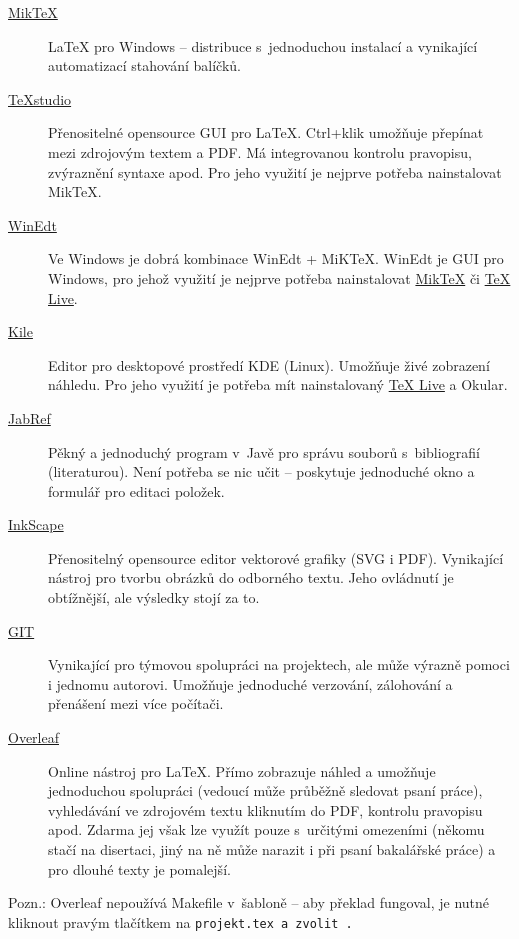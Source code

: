 \begin{description}
	\item[\href{http://miktex.org/download}{MikTeX}] \LaTeX{} pro Windows -- distribuce s~jednoduchou instalací a vynikající automatizací stahování balíčků.
	\item[\href{http://texstudio.sourceforge.net/}{TeXstudio}] Přenositelné opensource GUI pro \LaTeX{}.  Ctrl+klik umožňuje přepínat mezi zdrojovým textem a PDF. Má integrovanou kontrolu pravopisu, zvýraznění syntaxe apod. Pro jeho využití je nejprve potřeba nainstalovat MikTeX.
	\item[\href{http://www.winedt.com/}{WinEdt}] Ve Windows je dobrá kombinace WinEdt + MiKTeX. WinEdt je GUI pro Windows, pro jehož využití je nejprve potřeba nainstalovat \href{http://miktex.org/download}{MikTeX} či \href{http://www.tug.org/texlive/}{TeX Live}. 
	\item[\href{http://kile.sourceforge.net/}{Kile}] Editor pro desktopové prostředí KDE (Linux). Umožňuje živé zobrazení náhledu. Pro jeho využití je potřeba mít nainstalovaný \href{http://www.tug.org/texlive/}{TeX Live} a Okular. 
	\item[\href{http://jabref.sourceforge.net/download.php}{JabRef}] Pěkný a jednoduchý program v~Javě pro správu souborů s~bibliografií (literaturou). Není potřeba se nic učit -- poskytuje jednoduché okno a formulář pro editaci položek.
	\item[\href{https://inkscape.org/en/download/}{InkScape}] Přenositelný opensource editor vektorové grafiky (SVG i PDF). Vynikající nástroj pro tvorbu obrázků do odborného textu. Jeho ovládnutí je obtížnější, ale výsledky stojí za to.
	\item[\href{https://git-scm.com/}{GIT}] Vynikající pro týmovou spolupráci na projektech, ale může výrazně pomoci i jednomu autorovi. Umožňuje jednoduché verzování, zálohování a přenášení mezi více počítači.
	\item[\href{http://www.overleaf.com/}{Overleaf}] Online nástroj pro \LaTeX{}. Přímo zobrazuje náhled a umožňuje jednoduchou spolupráci (vedoucí může průběžně sledovat psaní práce), vyhledávání ve zdrojovém textu kliknutím do PDF, kontrolu pravopisu apod. Zdarma jej však lze využít pouze s~určitými omezeními (někomu stačí na disertaci, jiný na ně může narazit i při psaní bakalářské práce) a pro dlouhé texty je pomalejší.
\end{description}

Pozn.: Overleaf nepoužívá Makefile v~šabloně -- aby překlad fungoval, je nutné kliknout pravým tlačítkem na \tt projekt.tex \rm a zvolit .


